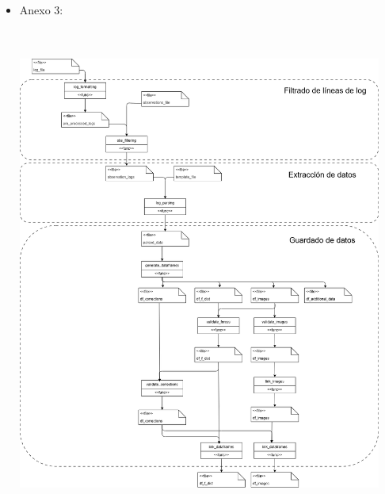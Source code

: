 \begin{itemize}
    \item Anexo 3:
        \\
        \\
        \vspace{3.5cm}
        \includegraphics[width=12cm,height=16cm]{figures/flow_diagram.png} \\
        \vspace{3.5cm}


\end{itemize}
